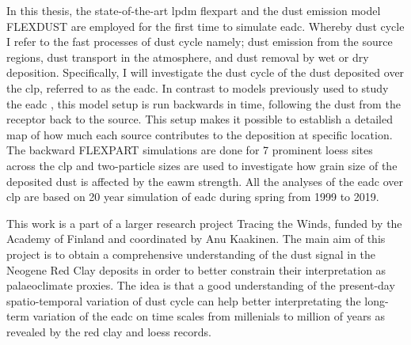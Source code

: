 In this thesis, the state-of-the-art \acrfull{lpdm}  \acrfull{flexpart} \parencite{Flexpart10.4_ref} and the dust emission model FLEXDUST \parencite{flexdust_ref_2016} are employed for the first time to simulate \acrfull{eadc}.
Whereby dust cycle I refer to the fast processes of dust cycle namely; dust emission from the source regions, dust transport in the atmosphere, and dust removal by wet or dry deposition. Specifically, I will investigate the dust cycle of the dust deposited over the \acrshort{clp}, referred to as the \acrshort{eadc}.
In contrast to  models previously used to study the \acrshort{eadc} \parencite{gong2006simulated,shi2011distinguishing,liu2018influence}, this model setup is run backwards in time, following the dust from the receptor back to the source. This setup makes it possible to establish a detailed map of how much each source contributes to the deposition at specific location. 
The backward FLEXPART simulations are done for 7 prominent loess sites across the \acrshort{clp} and two-particle sizes are used to investigate how grain size of the deposited dust is affected by the \acrshort{eawm} strength. All the analyses of the \acrshort{eadc} over \acrshort{clp} are based on 20 year simulation of \acrshort{eadc} during spring from 1999 to 2019.

This work is a part of a larger research project Tracing the Winds, funded by the Academy of Finland and coordinated by Anu Kaakinen. The main aim of this project is to obtain a comprehensive understanding of the dust signal in the Neogene Red Clay deposits in order to better constrain their interpretation as palaeoclimate proxies. The idea is that a good understanding of the present-day spatio-temporal variation of dust cycle can help better interpretating the long-term variation of the \acrshort{eadc} on time scales from millenials to million of years as revealed by the red clay and loess records.

